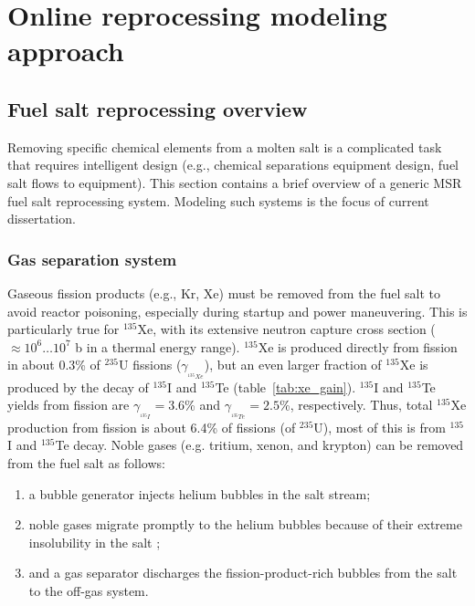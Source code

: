 \chapter[Online reprocessing modeling approach]{Online reprocessing modeling 
approach}
\section{Fuel salt reprocessing overview} \label{sec:reproc-plant}
Removing specific chemical elements from a molten salt is a complicated 
task that requires intelligent design (e.g., chemical separations equipment 
design, fuel salt flows to equipment). This section contains a brief overview 
of a generic \gls{MSR} fuel salt reprocessing system. Modeling such systems is 
the focus of current dissertation.

\subsection{Gas separation system} \label{sec:gas-separ}
Gaseous fission products (e.g., Kr, Xe) must be removed from the fuel salt 
to avoid reactor poisoning, especially during startup and power maneuvering. 
This is particularly true for $^{135}$Xe, with its extensive neutron capture 
cross section ($\approx10^6\dots10^7$ b in a thermal energy range). $^{135}$Xe 
is produced directly from fission in about 0.3\% of $^{235}$U fissions 
($\gamma_{_{^{135}Xe}}$), but an even larger fraction of $^{135}$Xe is 
produced by the decay of $^{135}$I and $^{135}$Te (table~\ref{tab:xe_gain}). 
$^{135}$I and $^{135}$Te yields from fission are 
$\gamma_{_{^{135}I}}\!=3.6$\% and $\gamma_{_{^{135}Te}}\!=2.5$\%, 
respectively. Thus, total $^{135}$Xe production  
from fission is about 6.4\% of fissions (of $^{235}$U), most of this is from 
$^{135}$I and $^{135}$Te decay. Noble gases (e.g. tritium, xenon, and krypton) 
can 
be removed from the fuel salt as follows:
\begin{enumerate}[label=(\alph*)]
	\item a bubble generator injects helium bubbles in the salt stream;
	\item noble gases migrate promptly to the helium bubbles because 
	of their extreme insolubility in the salt 
	\cite{robertson_conceptual_1971};
	\item and a gas separator discharges the fission-product-rich bubbles from 
	the salt to the off-gas system.
\end{enumerate}
